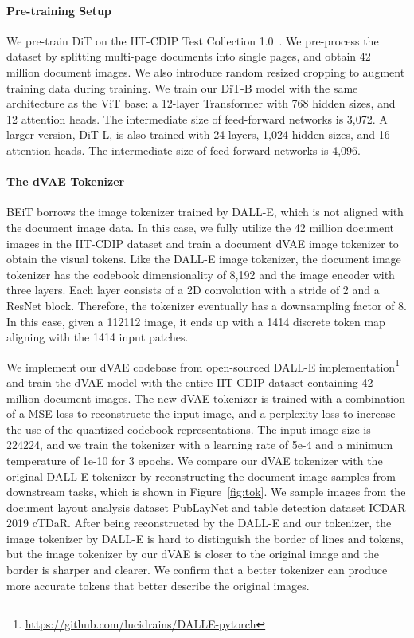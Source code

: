 \documentclass[sigconf]{acmart}
\begin{document}
\paragraph{Pre-training Setup}
We pre-train DiT on the IIT-CDIP Test Collection 1.0~\citep{Lewis:2006:BTC:1148170.1148307}. We pre-process the dataset by splitting multi-page documents into single pages, and obtain 42 million document images. We also introduce random resized cropping to augment training data during training. We train our DiT-B model with the same architecture as the ViT base: a 12-layer Transformer with 768 hidden sizes, and 12 attention heads. The intermediate size of feed-forward networks is 3,072. A larger version, DiT-L, is also trained with 24 layers, 1,024 hidden sizes, and 16 attention heads. The intermediate size of feed-forward networks is 4,096.



 

\paragraph{The dVAE Tokenizer}
BEiT borrows the image tokenizer trained by DALL-E, which is not aligned with the document image data. In this case, we fully utilize the 42 million document images in the IIT-CDIP dataset and train a document dVAE image tokenizer to obtain the visual tokens. Like the DALL-E image tokenizer, the document image tokenizer has the codebook dimensionality of 8,192 and the image encoder with three layers. Each layer consists of a 2D convolution with a stride of 2 and a ResNet block. Therefore, the tokenizer eventually has a downsampling factor of 8. In this case, given a 112112 image, it ends up with a 1414 discrete token map aligning with the 1414 input patches.

We implement our dVAE codebase from open-sourced DALL-E implementation\footnote{\url{https://github.com/lucidrains/DALLE-pytorch}} and train the dVAE model with the entire IIT-CDIP dataset containing 42 million document images. The new dVAE tokenizer is trained with a combination of a MSE loss to reconstructe the input image, and a perplexity loss to increase the use of the quantized codebook representations. The input image size is 224224, and we train the tokenizer with a learning rate of 5e-4 and a minimum temperature of 1e-10 for 3 epochs.
We compare our dVAE tokenizer with the original DALL-E tokenizer by reconstructing the document image samples from downstream tasks, which is shown in Figure~\ref{fig:tok}. We sample images from the document layout analysis dataset PubLayNet and table detection dataset ICDAR 2019 cTDaR. After being reconstructed by the DALL-E and our tokenizer, the image tokenizer by DALL-E is hard to distinguish the border of lines and tokens, but the image tokenizer by our dVAE is closer to the original image and the border is sharper and clearer. We confirm that a better tokenizer can produce more accurate tokens that better describe the original images.
\end{document}
